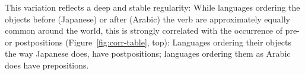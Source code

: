 \documentclass[9pt,twocolumn,twoside,lineno]{pnas-new}
\begin{document}
This variation reflects a deep and stable regularity:
While languages ordering the objects before (Japanese) or after (Arabic) the verb are approximately equally common around the world,
this is strongly correlated with the occurrence of pre- or postpositions (Figure~\ref{fig:corr-table}, top):
Languages ordering their objects the way Japanese does, have postpositions; languages ordering them as Arabic does have prepositions.
\end{document}
